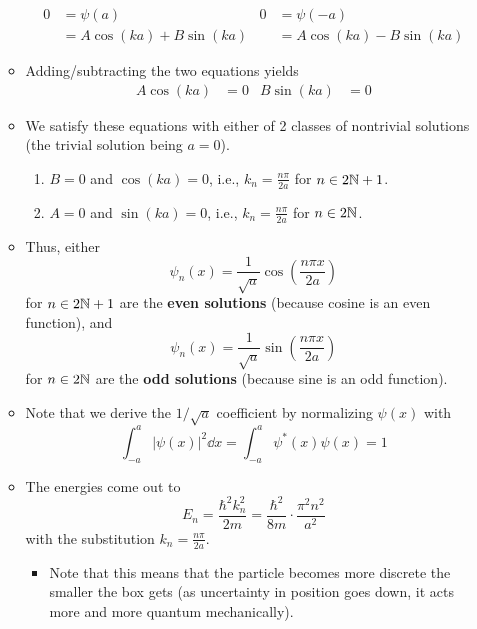 \documentclass[../notes.tex]{subfiles}
\begin{document}
\begin{itemize}
\begin{itemize}
        \begin{align*}
            0 &= \psi(a)&
                0 &= \psi(-a)\\
            &= A\cos(ka)+B\sin(ka)&
                &= A\cos(ka)-B\sin(ka)
        \end{align*}
        \item Adding/subtracting the two equations yields
        \begin{align*}
            A\cos(ka) &= 0&
            B\sin(ka) &= 0
        \end{align*}
        \item We satisfy these equations with either of 2 classes of nontrivial solutions (the trivial solution being $a=0$).
        \begin{enumerate}
            \item $B=0$ and $\cos(ka)=0$, i.e., $k_n=\frac{n\pi}{2a}$ for $n\in 2\mathbb{N}+1$.
            \item $A=0$ and $\sin(ka)=0$, i.e., $k_n=\frac{n\pi}{2a}$ for $n\in 2\mathbb{N}$.
        \end{enumerate}
        \item Thus, either
        \begin{equation*}
            \psi_n(x) = \frac{1}{\sqrt{a}}\cos\left( \frac{n\pi x}{2a} \right)
        \end{equation*}
        for $n\in 2\mathbb{N}+1$ are the \textbf{even solutions} (because cosine is an even function), and
        \begin{equation*}
            \psi_n(x) = \frac{1}{\sqrt{a}}\sin\left( \frac{n\pi x}{2a} \right)
        \end{equation*}
        for $n\in 2\mathbb{N}$ are the \textbf{odd solutions} (because sine is an odd function).
        \item Note that we derive the $1/\sqrt{a}$ coefficient by normalizing $\psi(x)$ with
        \begin{equation*}
            \int_{-a}^a|\psi(x)|^2\dd{x} = \int_{-a}^a\psi^*(x)\psi(x) = 1
        \end{equation*}
        \item The energies come out to
        \begin{equation*}
            E_n = \frac{\hbar^2k_n^2}{2m} = \frac{\hbar^2}{8m}\cdot\frac{\pi^2n^2}{a^2}
        \end{equation*}
        with the substitution $k_n=\frac{n\pi}{2a}$.
        \begin{itemize}
            \item Note that this means that the particle becomes more discrete the smaller the box gets (as uncertainty in position goes down, it acts more and more quantum mechanically).
        \end{itemize}
    \end{itemize}
\end{itemize}
\end{document}
